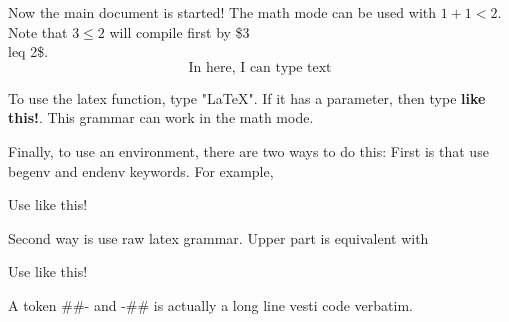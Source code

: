 \documentclass[item,korean]{coprime}
\begin{document}
Now the main document is started! The math mode can be used with $1+1<2$.
Note that $3\leq 2$ will compile first by \$3\\leq 2\$.
\[
    \text{In here, I can type text}
\]

To use the latex function, type "LaTeX". If it has a parameter,
then type \textbf{like this!}. This grammar can work in the math mode.

Finally, to use an environment, there are two ways to do this:
First is that use begenv and endenv keywords. For example,
\begin{center}
    \begin{minipage}{0.7\textwidth}
        Use like this!
    \end{minipage}
\end{center}

Second way is use raw latex grammar. Upper part is equivalent with

\begin{center}
    \begin{minipage}{0.7\textwidth}
        Use like this!
    \end{minipage}
\end{center}


A token \#\#- and -\#\# is actually a long line vesti code verbatim.
\end{document}

